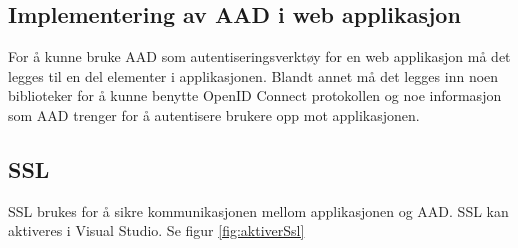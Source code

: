 \subsection{Implementering av AAD i web applikasjon}
\label{subsec:veiledninger_brukerveiledningForWebApplikasjon_implementeringAvAADIWebApplikasjon}
For å kunne bruke AAD som autentiseringsverktøy for en web applikasjon må det legges til en del elementer i applikasjonen. Blandt annet må det legges inn noen biblioteker for å kunne benytte OpenID Connect protokollen og noe informasjon som AAD trenger for å autentisere brukere opp mot applikasjonen.

\subsection*{SSL}
SSL brukes for å sikre kommunikasjonen mellom applikasjonen og AAD. SSL kan aktiveres i Visual Studio. Se figur \ref{fig:aktiverSsl}
\\
